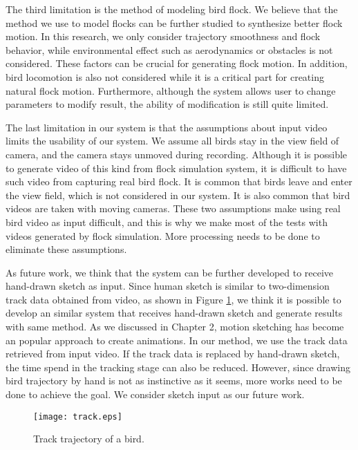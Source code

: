The third limitation is the method of modeling bird flock. We believe that the method we use to model flocks can be further studied to synthesize better flock motion. In this research, we only consider trajectory smoothness and flock behavior, while environmental effect such as aerodynamics or obstacles is not considered. These factors can be crucial for generating flock motion. In addition, bird locomotion is also not considered while it is a critical part for creating natural flock motion. Furthermore, although the system allows user to change parameters to modify result, the ability of modification is still quite limited.


The last limitation in our system is that the assumptions about input video limits the usability of our system. We assume all birds stay in the view field of camera, and the camera stays unmoved during recording. Although it is possible to generate video of this kind from flock simulation system, it is difficult to have such video from capturing real bird flock. It is common that birds leave and enter the view field, which is not considered in our system. It is also common that bird videos are taken with moving cameras. These two assumptions make using real bird video as input difficult, and this is why we make most of the tests with videos generated by flock simulation. More processing needs to be done to eliminate these assumptions.



As future work, we think that the system can be further developed to receive hand-drawn sketch as input. Since human sketch is similar to two-dimension track data obtained from video, as shown in Figure \ref{figure:track}, we think it is possible to develop an similar system that receives hand-drawn sketch and generate results with same method. As we discussed in Chapter 2, motion sketching has become an popular approach to create animations. In our method, we use the track data retrieved from input video. If the track data is replaced by hand-drawn sketch, the time spend in the tracking stage can also be reduced. However, since drawing bird trajectory by hand is not as instinctive as it seems, more works need to be done to achieve the goal. We consider sketch input as our future work.


\begin{figure}[h]
 \begin{center}
  \texttt{[image: track.eps]}
 \end{center}
 \caption{Track trajectory of a bird.}
 \label{figure:track}
\end{figure}